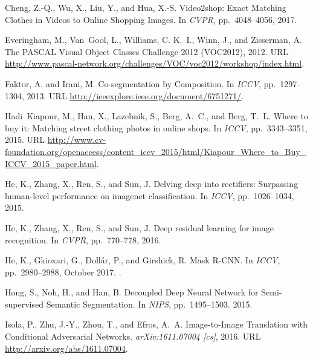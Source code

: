 \documentclass{article}
\begin{document}
\begin{thebibliography}{42}
Cheng, Z.-Q., Wu, X., Liu, Y., and Hua, X.-S.
\newblock Video2shop: {Exact} {Matching} {Clothes} in {Videos} to {Online}
  {Shopping} {Images}.
\newblock In \emph{CVPR}, pp.\  4048--4056, 2017.

Everingham, M., Van~Gool, L., Williams, C. K.~I., Winn, J., and Zisserman, A.
\newblock The {PASCAL} {V}isual {O}bject {C}lasses {C}hallenge 2012
  {(VOC2012)}, 2012.
\newblock URL
  \url{http://www.pascal-network.org/challenges/VOC/voc2012/workshop/index.html}.

Faktor, A. and Irani, M.
\newblock Co-segmentation by {Composition}.
\newblock In \emph{ICCV}, pp.\  1297--1304, 2013.
\newblock URL \url{http://ieeexplore.ieee.org/document/6751271/}.

Hadi~Kiapour, M., Han, X., Lazebnik, S., Berg, A.~C., and Berg, T.~L.
\newblock Where to buy it: {Matching} street clothing photos in online shops.
\newblock In \emph{ICCV}, pp.\  3343--3351, 2015.
\newblock URL
  \url{http://www.cv-foundation.org/openaccess/content_iccv_2015/html/Kiapour_Where_to_Buy_ICCV_2015_paper.html}.

He, K., Zhang, X., Ren, S., and Sun, J.
\newblock Delving deep into rectifiers: {Surpassing} human-level performance on
  imagenet classification.
\newblock In \emph{ICCV}, pp.\  1026--1034, 2015.

He, K., Zhang, X., Ren, S., and Sun, J.
\newblock Deep residual learning for image recognition.
\newblock In \emph{CVPR}, pp.\  770--778, 2016.

He, K., Gkioxari, G., Doll{\'a}r, P., and Girshick, R.
\newblock Mask {R}-{CNN}.
\newblock In \emph{ICCV}, pp.\  2980--2988, October 2017.
\newblock {}.

Hong, S., Noh, H., and Han, B.
\newblock Decoupled {Deep} {Neural} {Network} for {Semi}-supervised {Semantic}
  {Segmentation}.
\newblock In \emph{NIPS}, pp.\  1495--1503. 2015.

Isola, P., Zhu, J.-Y., Zhou, T., and Efros, A.~A.
\newblock Image-to-{Image} {Translation} with {Conditional} {Adversarial}
  {Networks}.
\newblock \emph{arXiv:1611.07004 [cs]}, 2016.
\newblock URL \url{http://arxiv.org/abs/1611.07004}.


\end{thebibliography}
\end{document}
